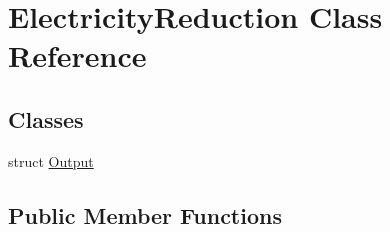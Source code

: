 \hypertarget{class_electricity_reduction}{}\section{Electricity\+Reduction Class Reference}
\label{class_electricity_reduction}
\subsection*{Classes}
\begin{DoxyCompactItemize}
\item 
struct \hyperlink{struct_electricity_reduction_1_1_output}{Output}
\end{DoxyCompactItemize}
\subsection*{Public Member Functions}
